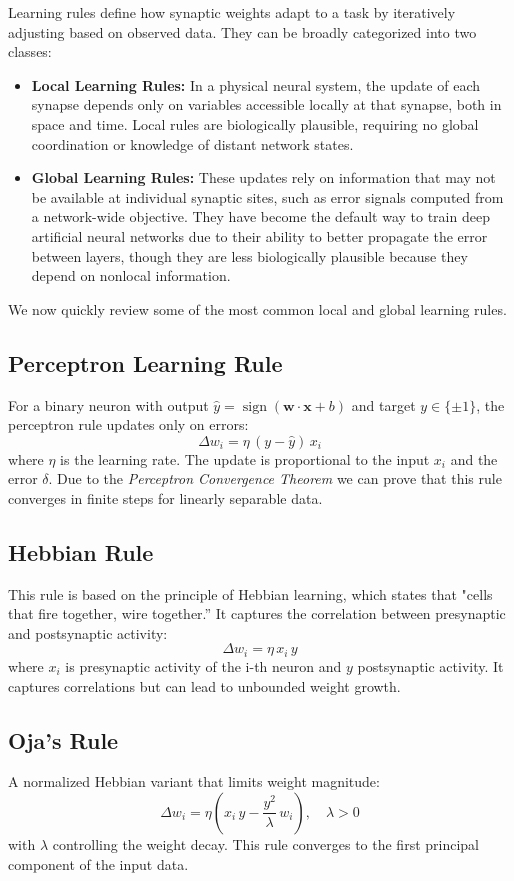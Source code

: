 \documentclass[a4paper,12pt]{report}
\begin{document}
Learning rules define how synaptic weights adapt to a task by iteratively adjusting based on observed data.
They can be broadly categorized into two classes:
\begin{itemize}
\item \textbf{Local Learning Rules:} In a physical neural system, the update of each synapse depends 
only on variables accessible locally at that synapse, both in space and time. \cite[Chapter~7]{Baldi2021}
Local rules are biologically plausible, requiring no global coordination or knowledge of distant 
network states.
\item \textbf{Global Learning Rules:} These updates rely on information that may not be available at 
individual synaptic sites, such as error signals computed from a network-wide objective. They have 
become the default way to train deep artificial neural networks due to their ability to better 
propagate the error between layers, though they are less biologically plausible because they depend on 
nonlocal information.
\end{itemize}

We now quickly review some of the most common local and global learning rules.
\subsection*{Perceptron Learning Rule}
For a binary neuron with output $\hat y=\operatorname{sign}(\mathbf{w}\cdot\mathbf{x}+b)$ and target $y\in\{\pm1\}$, the 
perceptron rule updates only on errors:
\[
  \Delta w_i = \eta\,\left(y - \hat y\right)\,x_i
\]
where $\eta$ is the learning rate. The update is proportional to the input $x_i$ and the error $\delta$.
Due to the \emph{Perceptron Convergence Theorem} we can prove that this rule converges 
in finite steps for linearly separable data.

\subsection*{Hebbian Rule}
This rule is based on the principle of Hebbian learning, which states that "cells that fire together, 
wire together.”
It captures the correlation between presynaptic and postsynaptic activity:
\[
  \Delta w_i = \eta\,x_i\,y
\]
where $x_i$ is presynaptic activity of the i-th neuron and $y$ postsynaptic activity. It captures 
correlations but can lead to unbounded weight growth.

\subsection*{Oja's Rule}
A normalized Hebbian variant that limits weight magnitude:
\[
  \Delta w_i = \eta \left(x_i\,y - \frac{y^2}{\lambda}\,w_i\right),\quad \lambda>0
\]
with $\lambda$ controlling the weight decay. This rule converges to the first principal component of the
input data.
\end{document}
